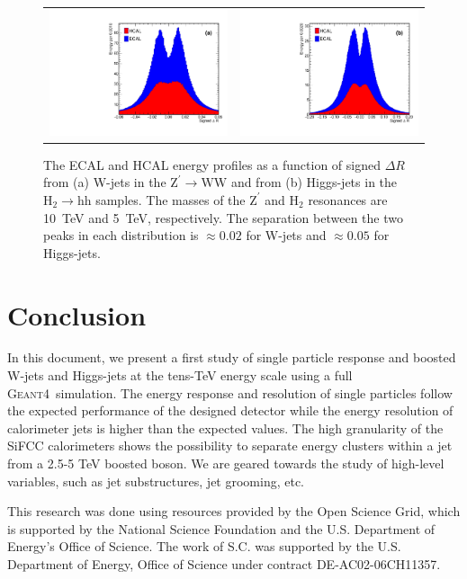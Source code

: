 \documentclass{PoS}
\newcommand{\GEANTfour} {{\textsc{Geant4}}}
\begin{document}
\begin{figure}
\begin{center}
\begin{tabular}{cc}
\includegraphics[width=.35\textwidth]{figs/ZprimeWW_h_signdR.pdf} &
\includegraphics[width=.35\textwidth]{figs/2HDM_h_signdR.pdf}\\
\end{tabular}
\end{center}
\caption{
The ECAL and HCAL energy profiles as a function of signed $\Delta R$ from 
(a) W-jets in the $\mathrm{Z}^{\prime}\rightarrow \mathrm{WW}$ and 
from (b) Higgs-jets in the $\mathrm{H}_2\rightarrow \mathrm{hh}$ 
samples. The masses of the $\mathrm{Z}^{\prime}$ and $\mathrm{H}_2$ resonances 
are 10~TeV and 5~TeV, respectively. The separation between the two peaks in 
each distribution is $\approx 0.02$ for W-jets and $\approx 0.05$ for 
Higgs-jets. }
\label{fig:angular}
\end{figure}


\section{Conclusion}
In this document, we present a first study of single particle response and 
boosted W-jets and Higgs-jets at the tens-TeV energy scale using a full 
\GEANTfour\ simulation. The 
energy response and resolution of single particles follow the expected 
performance of the designed detector while the energy resolution of 
calorimeter jets is higher than the expected values. 
The high granularity of the SiFCC calorimeters 
shows the possibility to separate energy 
clusters within a jet from a 2.5-5 TeV boosted boson. We are geared towards 
the study of high-level variables, such as jet substructures, jet grooming, 
etc.

\acknowledgments 
 This research was done using resources provided by the Open Science Grid,
which is supported by the National Science Foundation and the U.S.
Department of Energy's Office of Science. The work of S.C. was supported by 
the U.S. Department of Energy, Office of Science under contract DE-AC02-06CH11357.
\end{document}
